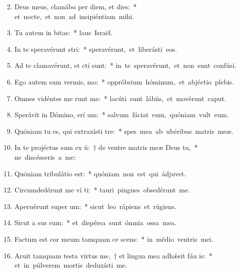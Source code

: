 \begin{flushleft}
\begin{enumerate}[leftmargin=*]
\setcounter{enumi}{1}

\item Deus meus, clamábo per diem, et  dies:~* \mbox{et nocte, et non ad insipiéntiam mihi.}
\item Tu autem in  bitas:~* \mbox{laus Israël.}
\item In te speravérunt  stri:~* \mbox{speravérunt, et liberásti eos.}
\item Ad te clamavérunt, et  cti sunt:~* \mbox{in te speravérunt, et non sunt confúsi.}
\item Ego autem sum vermis,   mo:~* \mbox{oppróbrium hóminum, et abjéctio plebis.}
\item Omnes vidéntes me runt me:~* \mbox{locúti sunt lábiis, et movérunt caput.}
\item Sperávit in Dómino, erí um:~* \mbox{salvum fáciat eum, quóniam vult eum.}
\item Quóniam tu es, qui extraxísti   tre:~* \mbox{spes mea ab ubéribus matris meæ.}
\item In te projéctus sum ex ú:~† de ventre matris meæ Deus   tu,~* \mbox{ne discésseris a me:}
\item Quóniam tribulátio  est:~* \mbox{quóniam non est qui ádjuvet.}
\item Circumdedérunt me ví ti:~* \mbox{tauri pingues obsedérunt me.}
\item Aperuérunt super   um:~* \mbox{sicut leo rápiens et rúgiens.}
\item Sicut a sus sum:~* \mbox{et dispérsa sunt ómnia ossa mea.}
\item Factum est cor meum tamquam ce scens:~* \mbox{in médio ventris mei.}
\item Aruit tamquam testa virtus me,~† et lingua mea adh\'{\ae}sit fáu is:~* \mbox{et in púlverem mortis deduxísti me.}

\end{enumerate}
\end{flushleft}
